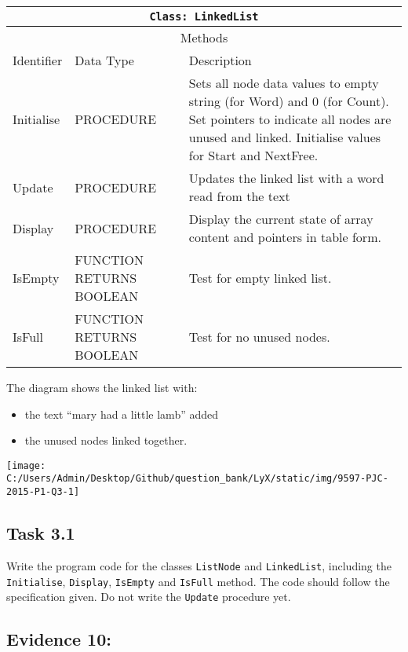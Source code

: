 \noindent \begin{center}
\begin{tabular}{|l|l|l|}
\hline 
\multicolumn{3}{|c|}{\texttt{Class: LinkedList}}\tabularnewline
\hline 
\multicolumn{3}{|c|}{Methods}\tabularnewline
\hline 
\texttt{\hspace{0.01\columnwidth}}Identifier & \texttt{\hspace{0.01\columnwidth}}Data Type & \texttt{\hspace{0.05\columnwidth}}Description\tabularnewline
\hline 
Initialise & PROCEDURE & Sets all node data values to empty string (for Word) and 0 (for Count).
Set pointers to indicate all nodes are unused and linked. Initialise
values for Start and NextFree.\tabularnewline
\hline 
Update & PROCEDURE & Updates the linked list with a word read from the text\tabularnewline
\hline 
Display & PROCEDURE & Display the current state of array content and pointers in table form.\tabularnewline
\hline 
IsEmpty & FUNCTION RETURNS BOOLEAN & Test for empty linked list.\tabularnewline
\hline 
IsFull & FUNCTION RETURNS BOOLEAN & Test for no unused nodes.\tabularnewline
\hline 
\end{tabular}
\par\end{center}

The diagram shows the linked list with: 
\begin{itemize}
\item the text \textquotedblleft mary had a little lamb\textquotedblright{}
added 
\item the unused nodes linked together. 
\end{itemize}
\begin{center}
\texttt{[image: C:/Users/Admin/Desktop/Github/question\_bank/LyX/static/img/9597-PJC-2015-P1-Q3-1]}
\par\end{center}

\subsection*{Task 3.1}

Write the program code for the classes \texttt{ListNode} and \texttt{LinkedList},
including the \texttt{Initialise}, \texttt{Display}, \texttt{IsEmpty}
and \texttt{IsFull} method. The code should follow the specification
given. Do not write the \texttt{Update} procedure yet. 

\subsection*{Evidence 10: }

